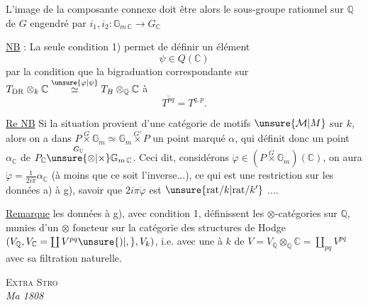 
L'image  de la composante connexe doit être alors le sous-groupe rationnel sur $\mathbb Q$ de $G$ engendré par $i_1,i_2\colon\mathbb G_{m\,\mathbb C}\longrightarrow G_{\mathbb C}$ 

\uline{NB} : La seule condition 1) permet de définir un élément
\[
\psi\in Q(\mathbb C)
\]
par la condition que la bigraduation correspondante sur $T_{\mathrm{DR}}\otimes_k\mathbb C\overset{\unsure{\varphi|\psi}}{\simeq}T_B\otimes_{\mathbb Q}\mathbb C$  à
\[
\overline{T^{pq}}=T^{q,p}.
\]

\uline{Re NB} Si  la situation  provient d'une catégorie de motifs $\unsure{\mathcal M|M}$ sur $k$, alors on a dans $P\overset{G}{\times}\mathbb G_m\simeq\mathbb G_m\overset{G'}{\times}P$ un point marqué $\alpha$, qui définit donc un point $\alpha_{\mathbb C}$ de $P_{\mathbb C}\overset{G_{\mathbb C}}{\unsure{\otimes|\times}}\mathbb G_{m\,\mathbb C}$. Ceci dit, considérons $\dot{\varphi}\in(P\overset{G}{\times}\mathbb G_m)(\mathbb C)$, on aura $\dot{\varphi}=\frac{1}{2i\pi}\alpha_{\mathbb C}$ (à moins que ce soit l'inverse...), ce qui est une restriction  sur les données a) à g), savoir que $2i\pi\dot{\varphi}$ est $\unsure{\mathrm{rat}/k|\mathrm{rat}/k^{\smash{\prime}}}$ ....

\uline{Remarque} les données  à g), avec condition 1, définissent les  $\otimes$-catégories sur $\mathbb Q$,  munies d'un $\otimes$ foncteur  sur la catégorie des structures de Hodge  $(V_{\mathbb Q},V_{\mathbb C}=\coprod V^{pq}\unsure{)|,},V_k)$, i.e. avec une    à $k$ de  $V=V_{\mathbb Q}\otimes_{\mathbb Q}\mathbb C=\coprod_{pq}V^{pq}$ avec sa filtration naturelle.
{\centering \textsc{Extra Stro}\\
\textit{Ma 1808}\par}
